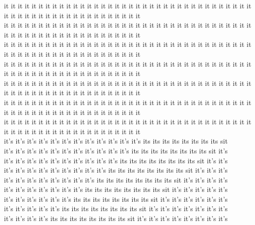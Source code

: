 it it it it it it it it it it it it it it it it it it it it it it it it it it it it it it it it it it it it it it it it it it it it it it it it it it it it it it it it\\
it it it it it it it it it it it it it it it it it it it it it it it it it it it it it it it it it it it it it it it it it it it it it it it it it it it it it it it it\\
it it it it it it it it it it it it it it it it it it it it it it it it it it it it it it it it it it it it it it it it it it it it it it it it it it it it it it it it\\
it it it it it it it it it it it it it it it it it it it it it it it it it it it it it it it it it it it it it it it it it it it it it it it it it it it it it it it it\\
it it it it it it it it it it it it it it it it it it it it it it it it it it it it it it it it it it it it it it it it it it it it it it it it it it it it it it it it\\
it it it it it it it it it it it it it it it it it it it it it it it it it it it it it it it it it it it it it it it it it it it it it it it it it it it it it it it it\\
it it it it it it it it it it it it it it it it it it it it it it it it it it it it it it it it it it it it it it it it it it it it it it it it it it it it it it it it\\
it's it's it's it's it's it's it's it's it's it's it's it's its its its its its its its its sit\\
it's it's it's it's it's it's it's it's it's it's it's its its its its its its its its sit it's\\
it's it's it's it's it's it's it's it's it's it's its its its its its its its its sit it's it's\\
it's it's it's it's it's it's it's it's it's its its its its its its its its sit it's it's it's\\
it's it's it's it's it's it's it's it's its its its its its its its its sit it's it's it's it's\\
it's it's it's it's it's it's it's its its its its its its its its sit it's it's it's it's it's\\
it's it's it's it's it's it's its its its its its its its its sit it's it's it's it's it's it's\\
it's it's it's it's it's its its its its its its its its sit it's it's it's it's it's it's it's\\
it's it's it's it's its its its its its its its its sit it's it's it's it's it's it's it's it's\\
